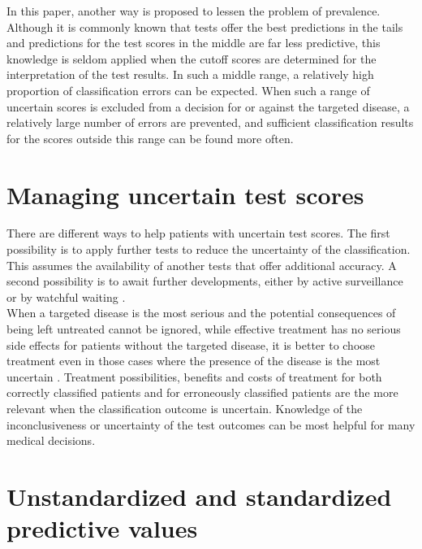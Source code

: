 \documentclass[
  nojss]{jss}
\begin{document}
In this paper, another way is proposed to lessen the problem of
prevalence. Although it is commonly known that tests offer the best
predictions in the tails and predictions for the test scores in the
middle are far less predictive, this knowledge is seldom applied when
the cutoff scores are determined for the interpretation of the test
results. In such a middle range, a relatively high proportion of
classification errors can be expected. When such a range of uncertain
scores is excluded from a decision for or against the targeted disease,
a relatively large number of errors are prevented, and sufficient
classification results for the scores outside this range can be found
more often.

\hypertarget{managing-uncertain-test-scores}{%
\section{Managing uncertain test
scores}\label{managing-uncertain-test-scores}}

There are different ways to help patients with uncertain test scores.
The first possibility is to apply further tests to reduce the
uncertainty of the classification. This assumes the availability of
another tests that offer additional accuracy. A second possibility is to
await further developments, either by active surveillance or by watchful
waiting \citep{bangma_active_2013}.\\
When a targeted disease is the most serious and the potential
consequences of being left untreated cannot be ignored, while effective
treatment has no serious side effects for patients without the targeted
disease, it is better to choose treatment even in those cases where the
presence of the disease is the most uncertain
\citep{brown_interval_2003, sonis_how_1999}. Treatment possibilities,
benefits and costs of treatment for both correctly classified patients
and for erroneously classified patients are the more relevant when the
classification outcome is uncertain. Knowledge of the inconclusiveness
or uncertainty of the test outcomes can be most helpful for many medical
decisions.

\hypertarget{unstandardized-and-standardized-predictive-values}{%
\section{Unstandardized and standardized predictive
values}\label{unstandardized-and-standardized-predictive-values}}
\end{document}
